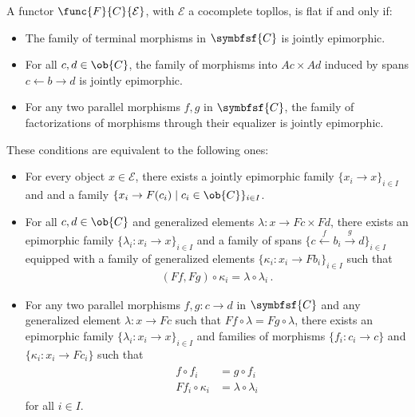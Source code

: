     \begin{property}
        A functor $\func{F}{C}{\mathcal{E}}$, with $\mathcal{E}$ a cocomplete topllos, is flat if and only if:
        \begin{itemize}
            \item The family of terminal morphisms in $\symbfsf{C}$ is jointly epimorphic.
            \item For all $c,d\in\ob{C}$, the family of morphisms into $Ac\times Ad$ induced by spans $c\leftarrow b\rightarrow d$ is jointly epimorphic.
            \item For any two parallel morphisms $f,g$ in $\symbfsf{C}$, the family of factorizations of morphisms through their equalizer is jointly epimorphic.
        \end{itemize}
        These conditions are equivalent to the following ones:
        \begin{itemize}
            \item For every object $x\in\mathcal{E}$, there exists a jointly epimorphic family $\{x_i\rightarrow x\}_{i\in I}$ and and a family $\{x_i\rightarrow F(c_i)\mid c_i\in\ob{C}\}_{i\in I}$.
            \item For all $c,d\in\ob{C}$ and generalized elements $\lambda:x\rightarrow Fc\times Fd$, there exists an epimorphic family $\{\lambda_i:x_i\rightarrow x\}_{i\in I}$ and a family of spans $\{c\xleftarrow{f}b_i\xrightarrow{g}d\}_{i\in I}$ equipped with a family of generalized elements $\{\kappa_i:x_i\rightarrow Fb_i\}_{i\in I}$ such that
            \begin{gather}
                (Ff,Fg)\circ\kappa_i = \lambda\circ\lambda_i\,.
            \end{gather}
            \item For any two parallel morphisms $f,g:c\rightarrow d$ in $\symbfsf{C}$ and any generalized element $\lambda:x\rightarrow Fc$ such that $Ff\circ\lambda=Fg\circ\lambda$, there exists an epimorphic family $\{\lambda_i:x_i\rightarrow x\}_{i\in I}$ and families of morphisms $\{f_i:c_i\rightarrow c\}$ and $\{\kappa_i:x_i\rightarrow Fc_i\}$ such that
            \begin{gather}
                \begin{aligned}
                    f\circ f_i &= g\circ f_i\\
                    Ff_i\circ\kappa_i &= \lambda\circ\lambda_i
                \end{aligned}
            \end{gather}
            for all $i\in I$.
        \end{itemize}
    \end{property}

